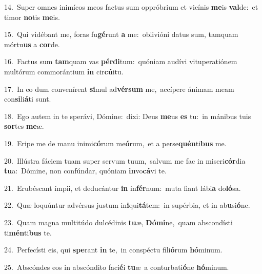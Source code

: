 {\numbfont\textcolor{\numbcolor}{14.}}~Super omnes inimícos meos factus sum oppróbrium et vicínis \textbf{me}\-is \textbf{val}\-de:~\star et timor \textbf{no}\-tis \textbf{me}\-is.\par
{\numbfont\textcolor{\numbcolor}{15.}}~Qui vidébant me, foras fu\-\textbf{gé}\-runt \textbf{a} me:~\star oblivióni datus sum, tamquam mórtu\textbf{us} a \textbf{cor}\-de.\par
{\numbfont\textcolor{\numbcolor}{16.}}~Factus sum \textbf{tam}\-quam vas \textbf{pér}\-\textbf{di}tum:~\star quóniam audívi vituperatiónem multórum commorántium \textbf{in} cir\-\textbf{cú}\-itu.\par
{\numbfont\textcolor{\numbcolor}{17.}}~In eo dum convenírent \textbf{si}\-mul ad\-\textbf{vér}\-\textbf{sum} me,~\star accípere ánimam meam con\-\textbf{si}\-li\-\textbf{á}\-ti sunt.\par
{\numbfont\textcolor{\numbcolor}{18.}}~Ego autem in te sperávi, Dómine:~\dagger dixi: Deus \textbf{me}\-us \textbf{es} tu:~\star in mánibus tuis \textbf{sor}\-tes \textbf{me}\-æ.\par
{\numbfont\textcolor{\numbcolor}{19.}}~Eripe me de manu inimi\-\textbf{có}\-rum me\-\textbf{ó}\-rum,~\star et a perse\-\textbf{quén}\-ti\textbf{bus} me.\par
{\numbfont\textcolor{\numbcolor}{20.}}~Illústra fáciem tuam super servum tuum,~\dagger salvum me fac in miseri\-\textbf{cór}\-dia \textbf{tu}\-a:~\star Dómine, non confúndar, quóniam \textbf{in}\-vo\-\textbf{cá}\-vi te.\par
{\numbfont\textcolor{\numbcolor}{21.}}~Erubéscant ímpii, et deducántur \textbf{in} in\-\textbf{fér}\-num:~\star muta fiant lábi\textbf{a} do\-\textbf{ló}\-sa.\par
{\numbfont\textcolor{\numbcolor}{22.}}~Quæ loquúntur advérsus justum in\-\textbf{i}\-qui\-\textbf{tá}\-tem:~\star in supérbia, et in ab\-\textbf{u}\-si\-\textbf{ó}\-ne.\par
{\numbfont\textcolor{\numbcolor}{23.}}~Quam magna multitúdo dulcédinis \textbf{tu}\-æ, \textbf{Dó}\-\textbf{mi}ne,~\star quam abscondísti ti\-\textbf{mén}\-ti\textbf{bus} te.\par
{\numbfont\textcolor{\numbcolor}{24.}}~Perfecísti eis, qui \textbf{spe}\-rant \textbf{in} te,~\star in conspéctu fili\-\textbf{ó}\-rum \textbf{hó}\-minum.\par
{\numbfont\textcolor{\numbcolor}{25.}}~Abscóndes eos in abscóndito faci\-\textbf{é}\-i \textbf{tu}\-æ~\star a conturbati\-\textbf{ó}\-ne \textbf{hó}\-minum.\par
